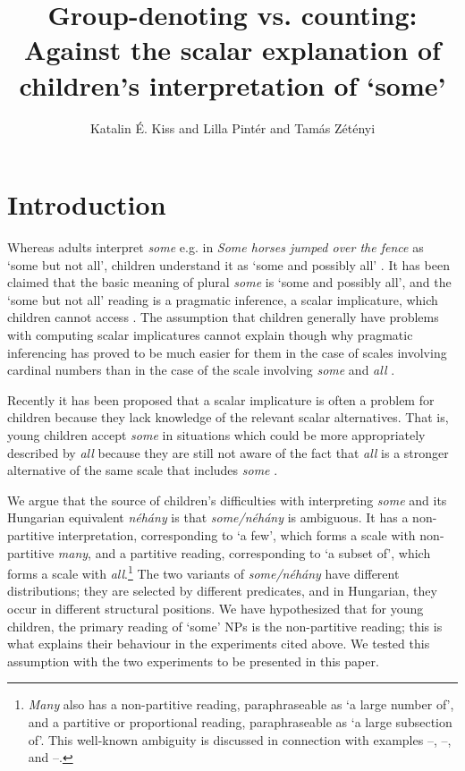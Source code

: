 \documentclass[output=paper]{langscibook}
\author{Katalin {É. Kiss}\affiliation{Research Institute for Linguistics} and Lilla Pintér\affiliation{Pázmány Péter Catholic University, Research Institute for Linguistics} and  Tamás Zétényi\affiliation{Budapest University of Technology and Economics}}
\title[Group-denoting vs. counting]{Group-denoting vs. counting: Against the scalar explanation of children's interpretation of `some'}
\begin{document}
\maketitle


\section{Introduction}\label{kis-zet:sec:introduction}

Whereas adults interpret \textit{some} e.g. in  \textit{Some horses jumped over the fence} as `some but not all', children understand it as `some and possibly all' \citep[e.g.][]{noveck2001children,papafragou2004children}. It has been claimed that the basic meaning of plural \textit{some} is `some and possibly all', and the `some but not all' reading is a pragmatic inference, a scalar implicature, which children cannot access \citep[see][]{noveck2001children,chierchia2001acquisition,papafragou2003scalar,guasti2005children,foppolo2012scalar,huang2009online,katsos2011pragmatic,barner2011accessing}. The assumption that children generally have problems with computing scalar implicatures cannot explain though why pragmatic inferencing has proved to be much easier for them in the case of scales involving cardinal numbers than in the case of the scale involving \textit{some} and \textit{all} \citep{papafragou2003scalar}.

Recently it has been proposed that a scalar implicature is often a problem for children because they lack knowledge of the relevant scalar alternatives. That is, young children accept \textit{some} in situations which could be more appropriately described by \textit{all} because they are still not aware of the fact that \textit{all} is a stronger alternative of the same scale that includes \textit{some} \citep{barner2011accessing,foppolo2012scalar,pagliarini2018children}.

We argue that the source of children's difficulties with interpreting \textit{some} and its Hungarian equivalent \textit{néhány} is that \textit{some/néhány} is ambiguous. It has a non-partitive interpretation, corresponding to `a few', which forms a scale with non-partitive \textit{many}, and a partitive reading, corresponding to `a subset of', which forms a scale with \textit{all}.\footnote{\textit{Many} also has a non-partitive reading, paraphraseable as `a large number of', and a partitive or proportional reading, paraphraseable as `a large subsection of'. This well-known ambiguity is discussed in connection with examples --, --, and --.} The two variants of \textit{some/néhány} have different distributions; they are selected by different predicates, and in Hungarian, they occur in different structural positions. We have hypothesized that for young children, the primary reading of `some' NPs is the non-partitive reading; this is what explains their behaviour in the experiments cited above. We tested this assumption with the two experiments to be presented in this paper.
\end{document}
